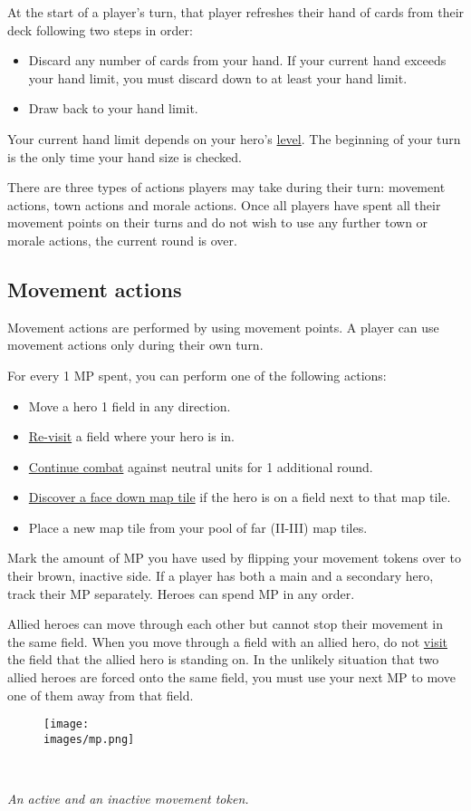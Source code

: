 At the start of a player’s turn, that player refreshes their hand of cards from their deck following two steps in order:
\begin{itemize}
  \item Discard any number of cards from your hand.
If your current hand exceeds your hand limit, you must discard down to at least your hand limit.
  \item Draw back to your hand limit.
\end{itemize}
Your current hand limit depends on your hero’s \hyperlink{Level}{level}.
The beginning of your turn is the only time your hand size is checked.\par
There are three types of actions players may take during their turn: movement actions, town actions and morale actions.
Once all players have spent all their movement points on their turns and do not wish to use any further town or morale actions, the current round is over.
\subsection*{Movement actions}
Movement actions are performed by using movement points.
A player can use movement actions only during their own turn.\par
For every 1 MP spent, you can perform one of the following actions:
\begin{itemize}
    \item Move a hero 1 field in any direction.
    \item \hyperlink{Categories}{Re-visit} a field where your hero is in.
    \item \hyperlink{Timelimit}{Continue combat} against neutral units for 1 additional round.
    \item \hyperlink{Placing}{Discover a face down map tile} if the hero is on a field next to that map tile.
    \item Place a new map tile from your pool of far (II-III) map tiles.
\end{itemize}
Mark the amount of MP you have used by flipping your movement tokens over to their brown, inactive side.
If a player has both a main and a secondary hero, track their MP separately.
Heroes can spend MP in any order.\par
Allied heroes can move through each other but cannot stop their movement in the same field.
When you move through a field with an allied hero, do not \hyperlink{Categories}{visit} the field that the allied hero is standing on.
In the unlikely situation that two allied heroes are forced onto the same field, you must use your next MP to move one of them away from that field.
\begin{figure}[h]
\centering
\texttt{[image: \\images/mp.png]}
\end{figure}\\
\begin{center}
\textit{An active and an inactive movement token.}
\end{center}

